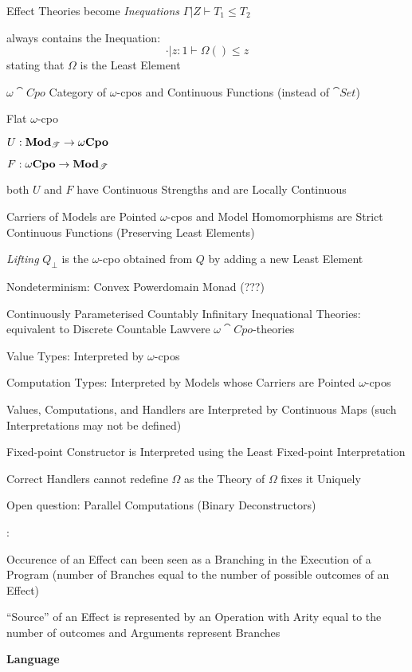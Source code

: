 Effect Theories become \emph{Inequations} $\Gamma | Z \vdash T_1 \leq
T_2$

always contains the Inequation:
\[
  \cdot | z:1 \vdash \Omega() \leq z
\]
stating that $\Omega$ is the Least Element

$\omega\cat{Cpo}$ Category of $\omega$-cpos and Continuous Functions
(instead of $\cat{Set}$)

Flat $\omega$-cpo

$U : \mathbf{Mod}_\mathscr{T} \rightarrow \omega \mathbf{Cpo}$

$F : \omega\mathbf{Cpo} \rightarrow \mathbf{Mod}_\mathscr{T}$

both $U$ and $F$ have Continuous Strengths and are Locally Continuous

Carriers of Models are Pointed $\omega$-cpos and Model Homomorphisms
are Strict Continuous Functions (Preserving Least Elements)

\emph{Lifting} $Q_\bot$ is the $\omega$-cpo obtained from $Q$ by
adding a new Least Element %

Nondeterminism: Convex Powerdomain Monad (???)

Continuously Parameterised Countably Infinitary Inequational Theories:
equivalent to Discrete Countable Lawvere $\omega\cat{Cpo}$-theories

Value Types: Interpreted by $\omega$-cpos

Computation Types: Interpreted by Models whose Carriers are Pointed
$\omega$-cpos

Values, Computations, and Handlers are Interpreted by Continuous Maps
(such Interpretations may not be defined)

Fixed-point Constructor is Interpreted using the Least Fixed-point
Interpretation %

Correct Handlers cannot redefine $\Omega$ as the Theory of $\Omega$
fixes it Uniquely

Open question: Parallel Computations (Binary Deconstructors)



\cite{pretnar15}:

Occurence of an Effect can been seen as a Branching in the Execution
of a Program (number of Branches equal to the number of possible
outcomes of an Effect)

``Source'' of an Effect is represented by an Operation with Arity
equal to the number of outcomes and Arguments represent Branches


\textbf{Language}


